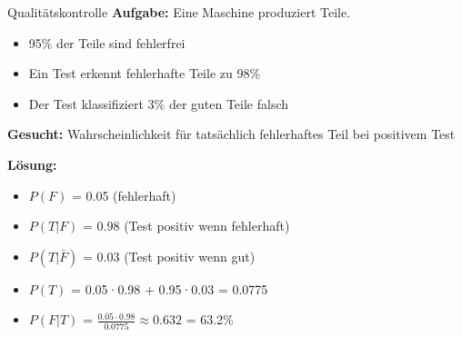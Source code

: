 \begin{example2}{Qualitätskontrolle}
\textbf{Aufgabe:} Eine Maschine produziert Teile. 
\begin{itemize}
\item 95\% der Teile sind fehlerfrei
\item Ein Test erkennt fehlerhafte Teile zu 98\%
\item Der Test klassifiziert 3\% der guten Teile falsch
\end{itemize}

\textbf{Gesucht:} Wahrscheinlichkeit für tatsächlich fehlerhaftes Teil bei positivem Test

\textbf{Lösung:}
\begin{itemize}
\item $P(F)$ = 0.05 (fehlerhaft)
\item $P(T|F)$ = 0.98 (Test positiv wenn fehlerhaft)
\item $P(T|\bar{F})$ = 0.03 (Test positiv wenn gut)
\item $P(T)$ = 0.05·0.98 + 0.95·0.03 = 0.0775
\item $P(F|T)$ = $\frac{0.05 \cdot 0.98}{0.0775} \approx 0.632$ = 63.2\%
\end{itemize}
\end{example2}

